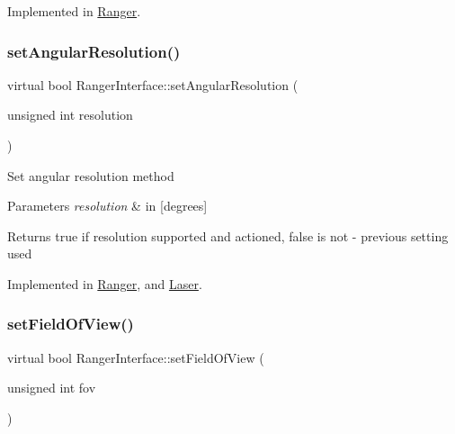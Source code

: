 Implemented in \hyperlink{classRanger_aec1e730fbf4b46b01b08f6655152fc39}{Ranger}.

\mbox{\label{classRangerInterface_aecffc9bbb58379da741c18326b9e41db}} 
\subsubsection{\texorpdfstring{set\+Angular\+Resolution()}{setAngularResolution()}}
{\footnotesize\ttfamily virtual bool Ranger\+Interface\+::set\+Angular\+Resolution (\begin{DoxyParamCaption}\item[{unsigned int}]{resolution }\end{DoxyParamCaption})\hspace{0.3cm}{\ttfamily [pure virtual]}}

Set angular resolution method 
\begin{DoxyParams}{Parameters}
{\em resolution} & in \mbox{[}degrees\mbox{]} \\
\hline
\end{DoxyParams}
\begin{DoxyReturn}{Returns}
true if resolution supported and actioned, false is not -\/ previous setting used 
\end{DoxyReturn}


Implemented in \hyperlink{classRanger_a3dc62dcba54eefbd7a0f08cbf97d87dc}{Ranger}, and \hyperlink{classLaser_a518ac84d4631b1550330d664e161ca0a}{Laser}.

\mbox{\label{classRangerInterface_a70357ca516198af45e2d503ef6af8f9f}} 
\subsubsection{\texorpdfstring{set\+Field\+Of\+View()}{setFieldOfView()}}
{\footnotesize\ttfamily virtual bool Ranger\+Interface\+::set\+Field\+Of\+View (\begin{DoxyParamCaption}\item[{unsigned int}]{fov }\end{DoxyParamCaption})\hspace{0.3cm}{\ttfamily [pure virtual]}}

